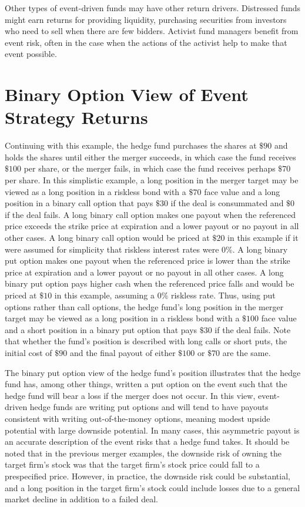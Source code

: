 \documentclass[11pt]{article}
\begin{document}
Other types of event-driven funds may have other return drivers. Distressed funds might earn returns for providing liquidity, purchasing securities from investors who need to sell when there are few bidders. Activist fund managers benefit from event risk, often in the case when the actions of the activist help to make that event possible.

\section*{Binary Option View of Event Strategy Returns}
Continuing with this example, the hedge fund purchases the shares at $\$ 90$ and holds the shares until either the merger succeeds, in which case the fund receives $\$ 100$ per share, or the merger fails, in which case the fund receives perhaps $\$ 70$ per share. In this simplistic example, a long position in the merger target may be viewed as a long position in a riskless bond with a $\$ 70$ face value and a long position in a binary call option that pays $\$ 30$ if the deal is consummated and $\$ 0$ if the deal fails. A long binary call option makes one payout when the referenced price exceeds the strike price at expiration and a lower payout or no payout in all other cases. A long binary call option would be priced at $\$ 20$ in this example if it were assumed for simplicity that riskless interest rates were $0 \%$. A long binary put option makes one payout when the referenced price is lower than the strike price at expiration and a lower payout or no payout in all other cases. A long binary put option pays higher cash when the referenced price falls and would be priced at $\$ 10$ in this example, assuming a $0 \%$ riskless rate. Thus, using put options rather than call options, the hedge fund's long position in the merger target may be viewed as a long position in a riskless bond with a $\$ 100$ face value and a short position in a binary put option that pays $\$ 30$ if the deal fails. Note that whether the fund's position is described with long calls or short puts, the initial cost of $\$ 90$ and the final payout of either $\$ 100$ or $\$ 70$ are the same.

The binary put option view of the hedge fund's position illustrates that the hedge fund has, among other things, written a put option on the event such that the hedge fund will bear a loss if the merger does not occur. In this view, event-driven hedge funds are writing put options and will tend to have payouts consistent with writing out-of-the-money options, meaning modest upside potential with large downside potential. In many cases, this asymmetric payout is an accurate description of the event risks that a hedge fund takes. It should be noted that in the previous merger examples, the downside risk of owning the target firm's stock was that the target firm's stock price could fall to a prespecified price. However, in practice, the downside risk could be substantial, and a long position in the target firm's stock could include losses due to a general market decline in addition to a failed deal.
\end{document}
